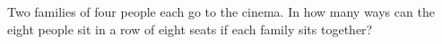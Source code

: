 Two families of four people each go to the cinema. In how many ways can the eight people sit in a row of eight seats if each family sits together?
